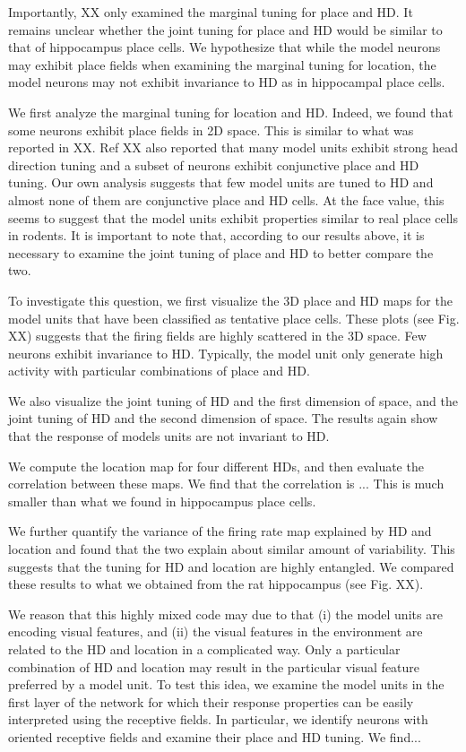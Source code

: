 \documentclass[11pt]{article}
\begin{document}
Importantly, XX only examined the marginal tuning for place and HD. It remains unclear whether the joint tuning for place and HD would be similar to that of hippocampus place cells. 
We hypothesize that while the model neurons may exhibit place fields when examining the marginal tuning for location, the model neurons may not exhibit invariance to HD as in hippocampal place cells. 

We first analyze the marginal tuning for location and HD. Indeed, we found that some neurons exhibit place fields in 2D space. This is similar to what was reported in XX. Ref XX also reported that many model units exhibit strong head direction tuning and a subset of neurons exhibit conjunctive place and HD tuning. Our own analysis suggests that few model units are tuned to HD and almost none of them are conjunctive place and HD cells. At the face value, this seems to suggest that the model units exhibit properties similar to real place cells in rodents. It is important to note that, according to our results above, it is necessary to examine the joint tuning of place and HD to better compare the two.

To investigate this question, we first visualize the 3D place and HD maps for the model units that have been classified as tentative place cells. These plots (see Fig. XX) suggests that the firing fields are highly scattered in the 3D space. Few neurons exhibit invariance to HD. Typically, the model unit only generate high activity with particular combinations of place and HD.

We also visualize the joint tuning of HD and the first dimension of space, and the joint tuning of HD and the second dimension of space. The results again show that the response of models units are not invariant to HD. 

We compute the location map for four different HDs, and then evaluate the correlation between these maps. We find that the correlation is ...
This is much smaller than what we found in hippocampus place cells.

We further quantify the variance of the firing rate map explained by HD and location and found that the two explain about similar amount of variability. This suggests that the tuning for HD and location are highly entangled. We compared these results to what we obtained from the rat hippocampus (see Fig. XX). 

We reason that this highly mixed code may due to that (i) the model units are encoding visual features, and (ii) the visual features in the environment are related to the HD and location in a complicated way. Only a particular combination of HD and location may result in the particular visual feature preferred by a model unit. To test this idea, we examine the model units in the first layer of the network for which their response properties can be easily interpreted using the receptive fields. In particular, we identify neurons with oriented receptive fields and examine their place and HD tuning. We find... 
\end{document}
